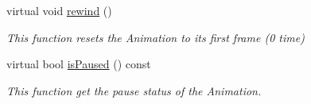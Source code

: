 \begin{DoxyCompactItemize}
\item 
virtual void \hyperlink{class_magnum_1_1_skeletal_animation_a0c6baff856d8dd1281833137c84fe617}{rewind} ()\hypertarget{class_magnum_1_1_skeletal_animation_a0c6baff856d8dd1281833137c84fe617}{}\label{class_magnum_1_1_skeletal_animation_a0c6baff856d8dd1281833137c84fe617}

\begin{DoxyCompactList}\small\item\em This function resets the Animation to its first frame (0 time) \end{DoxyCompactList}\item 
virtual bool \hyperlink{class_magnum_1_1_skeletal_animation_a5b01e6fba4eda5efe0ac300aabce7b14}{is\+Paused} () const 
\begin{DoxyCompactList}\small\item\em This function get the pause status of the Animation. \end{DoxyCompactList}\end{DoxyCompactItemize}
